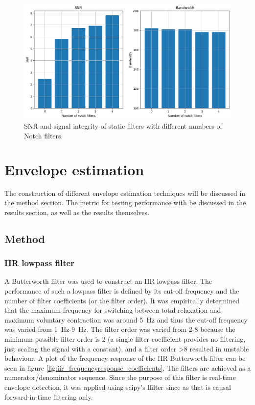 \begin{figure}[h!t]
	\begin{center}
		\includegraphics[width=0.7\columnwidth]{images/staticfilter_notches_barchart.png}
	\end{center}
	\caption{SNR and signal integrity of static filters with different numbers of Notch filters. }
	\label{fig:staticfilter_notches_barchart}
\end{figure}

\section{Envelope estimation}
The construction of different envelope estimation techniques will be discussed in the method section. The metric for testing performance with be discussed in the results section, as well as the results themselves.

\subsection{Method}
\subsubsection{IIR lowpass filter}
A Butterworth filter was used to construct an IIR lowpass filter. The performance of such a lowpass filter is defined by its cut-off frequency and the number of filter coefficients (or the filter order). It was empirically determined that the maximum frequency for switching between total relaxation and maximum voluntary contraction was around \SI{5}{\hertz} and thus the cut-off frequency was varied from \SI{1}{\hertz}-\SI{9}{\hertz}. The filter order was varied from 2-8 because the minimum possible filter order is 2 (a single filter coefficient provides no filtering, just scaling the signal with a constant), and a filter order >8 resulted in unstable behaviour. A plot of the frequency response of the IIR Butterworth filter can be seen in figure \ref{fig:iir_frequencyresponse_coefficients}. The filters are achieved as a numerator/denominator sequence. Since the purpose of this filter is real-time envelope detection, it was applied using scipy's lfilter since as that is causal forward-in-time filtering only.


